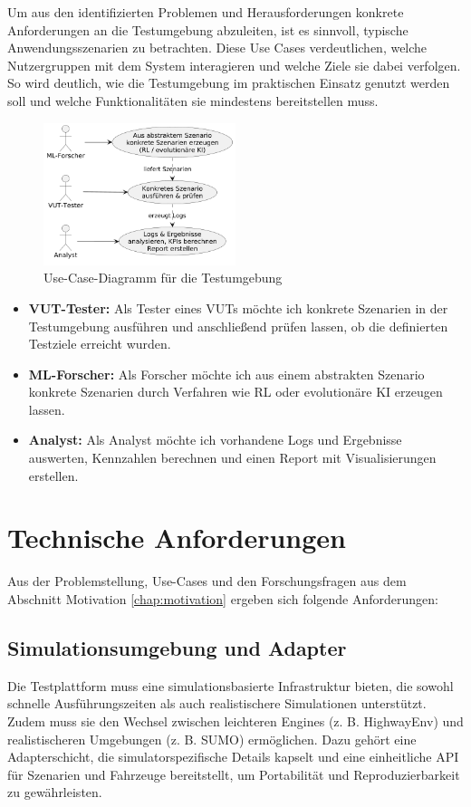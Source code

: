 Um aus den identifizierten Problemen und Herausforderungen konkrete Anforderungen an die Testumgebung abzuleiten, ist es sinnvoll, typische Anwendungsszenarien zu betrachten. Diese Use Cases verdeutlichen, welche Nutzergruppen mit dem System interagieren und welche Ziele sie dabei verfolgen. So wird deutlich, wie die Testumgebung im praktischen Einsatz genutzt werden soll und welche Funktionalitäten sie mindestens bereitstellen muss.

\begin{figure}[h]
    \centering
    \includegraphics[width=0.5\textwidth]{contents/figures/UseCaseDiagramm_InteProjekt.png}
    \caption{Use-Case-Diagramm für die Testumgebung}
    \label{fig:UseCaseDiagramm}
\end{figure}


\begin{itemize}
    \item \textbf{VUT-Tester:} Als Tester eines VUTs möchte ich konkrete Szenarien in der Testumgebung ausführen und anschließend prüfen lassen, ob die definierten Testziele erreicht wurden.
    \item \textbf{ML-Forscher:} Als Forscher möchte ich aus einem abstrakten Szenario konkrete Szenarien durch Verfahren wie RL oder evolutionäre KI erzeugen lassen.
    \item \textbf{Analyst:} Als Analyst möchte ich vorhandene Logs und Ergebnisse auswerten, Kennzahlen berechnen und einen Report mit Visualisierungen erstellen.
\end{itemize}

\section{Technische Anforderungen}

Aus der Problemstellung, Use-Cases und den Forschungsfragen aus dem Abschnitt Motivation \ref{chap:motivation} ergeben sich folgende Anforderungen:

\subsection{Simulationsumgebung und Adapter}
Die Testplattform muss eine simulationsbasierte Infrastruktur bieten, die sowohl schnelle Ausführungszeiten als auch realistischere Simulationen unterstützt. Zudem muss sie den Wechsel zwischen leichteren Engines (z. B. HighwayEnv) und realistischeren Umgebungen (z. B. SUMO) ermöglichen. Dazu gehört eine Adapterschicht, die simulatorspezifische Details kapselt und eine einheitliche API für Szenarien und Fahrzeuge bereitstellt, um Portabilität und Reproduzierbarkeit zu gewährleisten.

